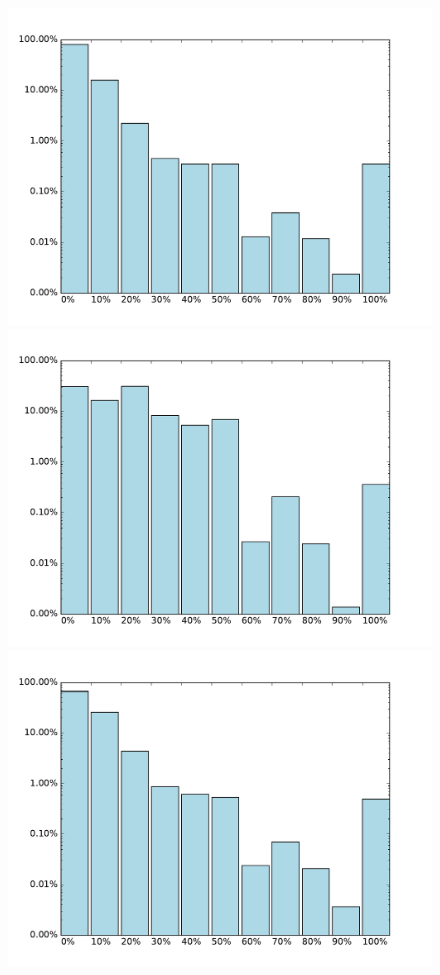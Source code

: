 \begin{figure}[H]
	\includegraphics[width=\linewidth]{img/reddit_vocab_analyze_50k_perc.pdf}
	\centering
	\small
	\endminipage\hfill
	\includegraphics[width=\linewidth]{img/opus_vocab_analyze_50k_perc.pdf}
	\centering
	\small
	\endminipage\hfill
	\includegraphics[width=\linewidth]{img/reddit_vocab_analyze_25k_perc.pdf}

\end{figure}

